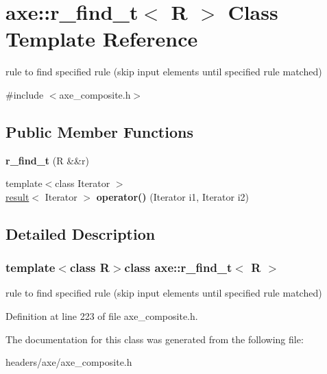 \hypertarget{classaxe_1_1r__find__t}{\section{axe\+:\+:r\+\_\+find\+\_\+t$<$ R $>$ Class Template Reference}
\label{classaxe_1_1r__find__t}
}


rule to find specified rule (skip input elements until specified rule matched)  




{\ttfamily \#include $<$axe\+\_\+composite.\+h$>$}

\subsection*{Public Member Functions}
\begin{DoxyCompactItemize}
\item 
\hypertarget{classaxe_1_1r__find__t_a73900b20f484da8b382e8fb7755ac2ea}{{\bfseries r\+\_\+find\+\_\+t} (R \&\&r)}\label{classaxe_1_1r__find__t_a73900b20f484da8b382e8fb7755ac2ea}

\item 
\hypertarget{classaxe_1_1r__find__t_a16afd4b324ed6bfe036ee5c0c9410a88}{{\footnotesize template$<$class Iterator $>$ }\\\hyperlink{structaxe_1_1result}{result}$<$ Iterator $>$ {\bfseries operator()} (Iterator i1, Iterator i2)}\label{classaxe_1_1r__find__t_a16afd4b324ed6bfe036ee5c0c9410a88}

\end{DoxyCompactItemize}


\subsection{Detailed Description}
\subsubsection*{template$<$class R$>$class axe\+::r\+\_\+find\+\_\+t$<$ R $>$}

rule to find specified rule (skip input elements until specified rule matched) 

Definition at line 223 of file axe\+\_\+composite.\+h.



The documentation for this class was generated from the following file\+:\begin{DoxyCompactItemize}
\item 
headers/axe/axe\+\_\+composite.\+h\end{DoxyCompactItemize}
